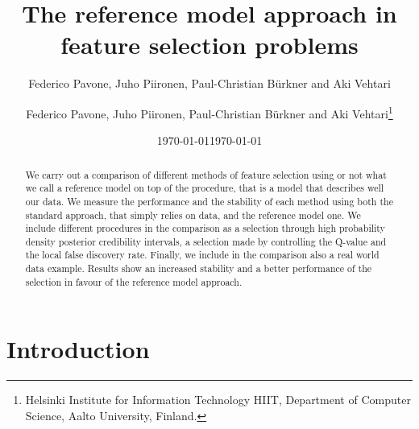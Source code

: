 \documentclass[american,]{article}
\title{The reference model approach in feature selection problems 
	\vspace{.1in}}
\author{Federico Pavone, Juho Piironen, Paul-Christian B\"{u}rkner and Aki Vehtari}
\author{
    Federico Pavone, 
  Juho Piironen,
  Paul-Christian B\"{u}rkner
  and Aki Vehtari\footnote{Helsinki Institute for Information Technology HIIT,
  Department of Computer Science, Aalto University, Finland.}
  }
\date{\today}
\date{\today}
\theoremstyle{definition}
\begin{document}
\maketitle
\begin{abstract}
We carry out a comparison of different methods of feature selection using or not what we call a reference model on top of the procedure, that is a model that describes well our data. We measure the performance and the stability of each method using both the standard approach, that simply relies on data, and the reference model one. We include different procedures in the comparison as a selection through high probability density posterior credibility intervals, a selection made by controlling the Q-value and the local false discovery rate. Finally, we include in the comparison also a real world data example. Results show an increased stability and a better performance of the selection in favour of the reference model approach.
\end{abstract}

\hypertarget{introduction}{%
\section{Introduction}\label{introduction}}

\end{document}
